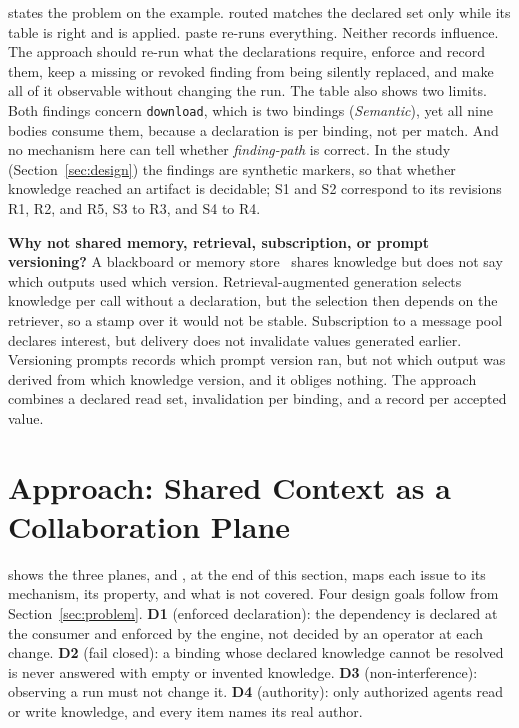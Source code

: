 \documentclass[10pt,conference]{IEEEtran}
\theoremstyle{definition}
\newcommand{\code}[1]{\texttt{#1}}
\newcommand{\pol}[1]{\textsf{#1}} %
\begin{document}
 states the problem on the example. \pol{routed} matches the declared set only while its
table is right and is applied. \pol{paste} re-runs everything. Neither records influence. The approach should
re-run what the declarations require, enforce and record them, keep a missing or revoked finding from being
silently replaced, and make all of it observable without changing the run. The table also shows two limits.
Both findings concern \code{download}, which is two bindings (\emph{Semantic}), yet all nine bodies consume
them, because a declaration is per binding, not per match. And no mechanism here can tell whether
\emph{finding-path} is correct. In the study (Section~\ref{sec:design}) the findings are synthetic markers,
so that whether knowledge reached an artifact is decidable; S1 and S2 correspond to its revisions R1, R2, and
R5, S3 to R3, and S4 to R4.

\textbf{Why not shared memory, retrieval, subscription, or prompt versioning?} A blackboard or memory
store~\cite{nii1986blackboard,packer2023memgpt} shares knowledge but does not say which outputs used which
version. Retrieval-augmented generation selects knowledge per call without a declaration, but the selection
then depends on the retriever, so a stamp over it would not be stable. Subscription to a message
pool~\cite{hong2024metagpt} declares interest, but delivery does not invalidate values generated earlier.
Versioning prompts records which prompt version ran, but not which output was derived from which knowledge
version, and it obliges nothing. The approach combines a declared read set, invalidation per binding, and a
record per accepted value.

\section{Approach: Shared Context as a Collaboration Plane}\label{sec:approach}

 shows the three planes, and , at the end of this section, maps each
issue to its mechanism, its property, and what is not covered. Four design goals follow from
Section~\ref{sec:problem}. \textbf{D1} (enforced declaration): the dependency is declared at the consumer and
enforced by the engine, not decided by an operator at each change. \textbf{D2} (fail closed): a binding whose
declared knowledge cannot be resolved is never answered with empty or invented knowledge. \textbf{D3}
(non-interference): observing a run must not change it. \textbf{D4} (authority): only authorized agents read
or write knowledge, and every item names its real author.
\end{document}

